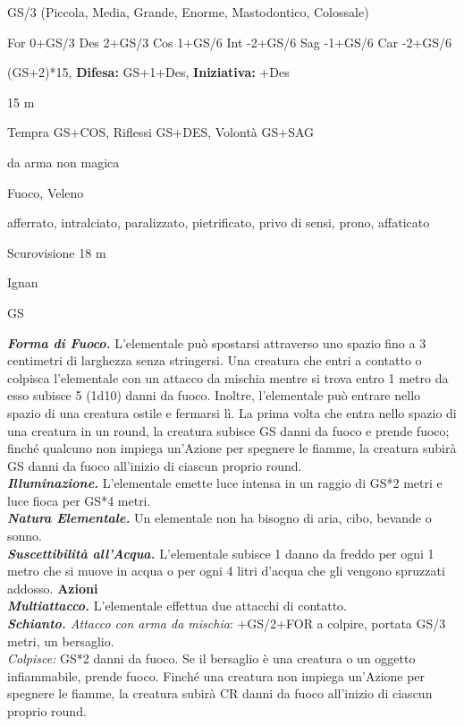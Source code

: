 \begin{multicols}{2}
{
\noindent
\begin{description}[noitemsep, topsep=0pt, parsep=0pt, partopsep=0pt, leftmargin=0cm, labelwidth=2.2cm]
	\item[\textbf{Taglia/Tipo:}] GS/3 (Piccola, Media, Grande, Enorme, Mastodontico, Colossale)
	\item[\textbf{Caratt.:}] For 0+GS/3 Des 2+GS/3 Cos 1+GS/6 Int -2+GS/6 Sag -1+GS/6 Car -2+GS/6
	\item[\textbf{Punti Ferita:}] (GS+2)*15, \textbf{Difesa:} GS+1+Des, \textbf{Iniziativa:} +Des
	\item[\textbf{Movimento:}] 15 m
	\item[\textbf{Tiri Salvez.:}] Tempra GS+COS, Riflessi GS+DES, Volontà GS+SAG
	\item[\textbf{Res. Danni:}] da arma non magica
	\item[\textbf{Imm. Danni:}] Fuoco, Veleno
	\item[\textbf{Immunità:}] afferrato, intralciato, paralizzato, pietrificato, privo di sensi, prono, affaticato
	\item[\textbf{Sensi:}] Scurovisione 18 m
	\item[\textbf{Linguaggi:}] Ignan
	\item[\textbf{Sfida:}] GS \\
\end{description}

\emph{\textbf{Forma di Fuoco.}} L'elementale può spostarsi attraverso uno spazio fino a 3 centimetri di larghezza senza stringersi. Una creatura che entri a contatto o colpisca l'elementale con un attacco da mischia mentre si trova entro 1 metro da esso subisce 5 (1d10) danni da fuoco. Inoltre, l'elementale può entrare nello spazio di una creatura ostile e fermarsi lì. La prima volta che entra nello spazio di una creatura in un round, la creatura subisce GS danni da fuoco e prende fuoco; finché qualcuno non impiega un'Azione per spegnere le fiamme, la creatura subirà GS danni da fuoco all'inizio di ciascun proprio round.\\

\emph{\textbf{Illuminazione.}} L'elementale emette luce intensa in un raggio di GS*2 metri e luce fioca per GS*4 metri.\\
\emph{\textbf{Natura Elementale.}} Un elementale non ha bisogno di aria, cibo, bevande o sonno.\\
\emph{\textbf{Suscettibilità all'Acqua.}} L'elementale subisce 1 danno da freddo per ogni 1 metro che si muove in acqua o per ogni 4 litri d'acqua che gli vengono spruzzati addosso.
\textbf{Azioni}\\
\emph{\textbf{Multiattacco.}} L'elementale effettua due attacchi di contatto.\\
\emph{\textbf{Schianto.} Attacco con arma da mischia}: +GS/2+FOR a colpire, portata GS/3 metri, un bersaglio.\\
\emph{Colpisce:} GS*2 danni da fuoco. Se il bersaglio è una creatura o un oggetto infiammabile, prende fuoco. Finché una creatura non impiega un'Azione per spegnere le fiamme, la creatura subirà CR danni da fuoco all'inizio di ciascun proprio round.

}
\end{multicols}
